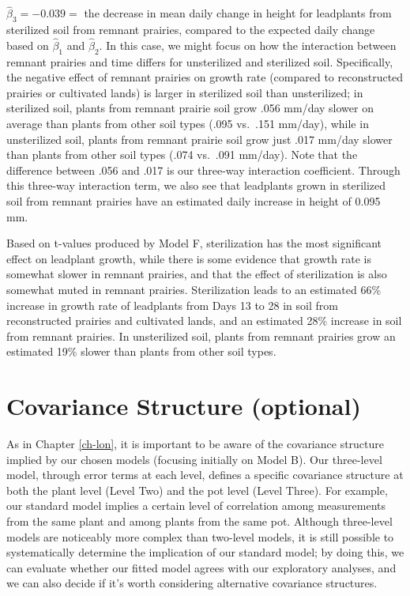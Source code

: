 \documentclass[
]{krantz}
\begin{document}
\begin{itemize}
  \(\hat{\beta}_{3}=-0.039=\) the decrease in mean daily change in height for leadplants from sterilized soil from remnant prairies, compared to the expected daily change based on \(\hat{\beta}_{1}\) and \(\hat{\beta}_{2}\). In this case, we might focus on how the interaction between remnant prairies and time differs for unsterilized and sterilized soil. Specifically, the negative effect of remnant prairies on growth rate (compared to reconstructed prairies or cultivated lands) is larger in sterilized soil than unsterilized; in sterilized soil, plants from remnant prairie soil grow .056 mm/day slower on average than plants from other soil types (.095 vs.~.151 mm/day), while in unsterilized soil, plants from remnant prairie soil grow just .017 mm/day slower than plants from other soil types (.074 vs.~.091 mm/day). Note that the difference between .056 and .017 is our three-way interaction coefficient. Through this three-way interaction term, we also see that leadplants grown in sterilized soil from remnant prairies have an estimated daily increase in height of 0.095 mm.
\end{itemize}

Based on t-values produced by Model F, sterilization has the most significant effect on leadplant growth, while there is some evidence that growth rate is somewhat slower in remnant prairies, and that the effect of sterilization is also somewhat muted in remnant prairies. Sterilization leads to an estimated 66\% increase in growth rate of leadplants from Days 13 to 28 in soil from reconstructed prairies and cultivated lands, and an estimated 28\% increase in soil from remnant prairies. In unsterilized soil, plants from remnant prairies grow an estimated 19\% slower than plants from other soil types.

\section{Covariance Structure (optional)}\label{error-3level}

As in Chapter \ref{ch-lon}, it is important to be aware of the covariance structure  implied by our chosen models (focusing initially on Model B). Our three-level model, through error terms at each level, defines a specific covariance structure at both the plant level (Level Two) and the pot level (Level Three). For example, our standard model implies a certain level of correlation among measurements from the same plant and among plants from the same pot. Although three-level models are noticeably more complex than two-level models, it is still possible to systematically determine the implication of our standard model; by doing this, we can evaluate whether our fitted model agrees with our exploratory analyses, and we can also decide if it's worth considering alternative covariance structures.
\end{document}
